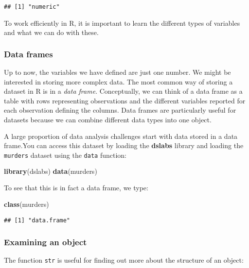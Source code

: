 \documentclass[
]{article}
\newenvironment{Shaded}{\begin{snugshade}}{\end{snugshade}}
\newcommand{\FunctionTok}[1]{\textcolor[rgb]{0.13,0.29,0.53}{\textbf{#1}}}
\newcommand{\NormalTok}[1]{#1}
\begin{document}
\begin{verbatim}
## [1] "numeric"
\end{verbatim}

To work efficiently in R, it is important to learn the different types
of variables and what we can do with these.

\subsubsection{Data frames}\label{data-frames}

Up to now, the variables we have defined are just one number. We might
be interested in storing more complex data. The most common way of
storing a dataset in R is in a \emph{data frame}. Conceptually, we can
think of a data frame as a table with rows representing observations and
the different variables reported for each observation defining the
columns. Data frames are particularly useful for datasets because we can
combine different data types into one object.

A large proportion of data analysis challenges start with data stored in
a data frame.You can access this dataset by loading the \textbf{dslabs}
library and loading the \texttt{murders} dataset using the \texttt{data}
function:

\begin{Shaded}
\begin{Highlighting}[]
\FunctionTok{library}\NormalTok{(dslabs)}
\FunctionTok{data}\NormalTok{(murders)}
\end{Highlighting}
\end{Shaded}

To see that this is in fact a data frame, we type:

\begin{Shaded}
\begin{Highlighting}[]
\FunctionTok{class}\NormalTok{(murders)}
\end{Highlighting}
\end{Shaded}

\begin{verbatim}
## [1] "data.frame"
\end{verbatim}

\subsubsection{Examining an object}\label{examining-an-object}

The function \texttt{str} is useful for finding out more about the
structure of an object:
\end{document}
